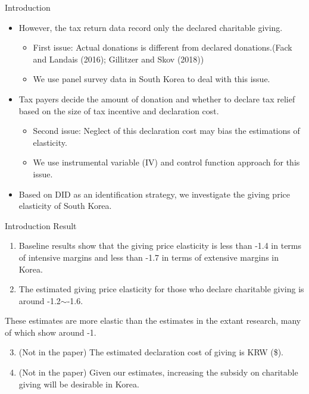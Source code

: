 \documentclass[dvipdfmx,10pt]{beamer}
\begin{document}
	\begin{frame}{Introduction}
		\protect\hypertarget{introduction-1}{}
		\begin{itemize}
			\item
			However, the tax return data record only the declared charitable giving.
			
			\begin{itemize}
				\item
				First issue: Actual donations is different from declared donations.(Fack and Landais (2016); Gillitzer and Skov (2018))
				\item
				We use panel survey data in South Korea to deal with this issue.
			\end{itemize}
			\item
			Tax payers decide the amount of donation and whether to declare tax relief based on the size of tax incentive and declaration cost.
			
			\begin{itemize}
				\item
				Second issue: Neglect of this declaration cost may bias the estimations of elasticity.
				\item
				We use instrumental variable (IV) and control function approach for this issue.
			\end{itemize}
			\item
			Based on DID as an identification strategy, we investigate the giving price elasticity of South Korea.
		\end{itemize}
	\end{frame}
	
	\begin{frame}{Introduction}
		\protect\hypertarget{introduction-2}{}
		Result
		
		\begin{enumerate}
			\item
			Baseline results show that the giving price elasticity is less than -1.4 in terms of intensive margins and less than -1.7 in terms of extensive margins in Korea.
			\item
			The estimated giving price elasticity for those who declare charitable giving is around -1.2\(\sim\)-1.6.
		\end{enumerate}
		
		These estimates are more elastic than the estimates in the extant research, many of which show around -1.
		
		\begin{enumerate}
			\setcounter{enumi}{2}
			\item
			(Not in the paper) The estimated declaration cost of giving is KRW (\$).
			\item
			(Not in the paper) Given our estimates, increasing the subsidy on charitable giving will be desirable in Korea.
		\end{enumerate}
	\end{frame}
	
\end{document}
